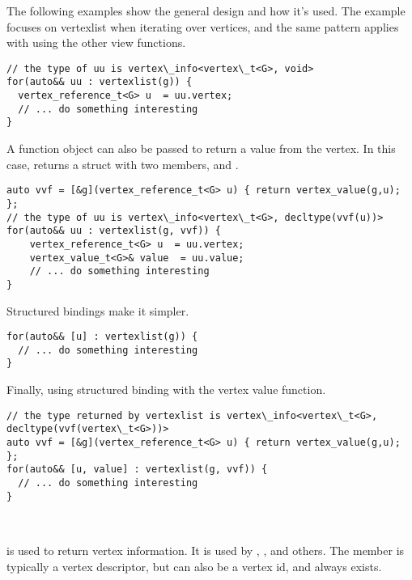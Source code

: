 The following examples show the general design and how it's used. The example focuses 
on vertexlist when iterating over vertices, and the same pattern applies with using the other
view functions.

\begin{lstlisting}
// the type of uu is vertex\_info<vertex\_t<G>, void>
for(auto&& uu : vertexlist(g)) {
  vertex_reference_t<G> u  = uu.vertex;
  // ... do something interesting
}
\end{lstlisting}

A function object can also be passed to return a value from the vertex. In this case,  returns 
a struct with two members,  and .
\begin{lstlisting}
auto vvf = [&g](vertex_reference_t<G> u) { return vertex_value(g,u); };
// the type of uu is vertex\_info<vertex\_t<G>, decltype(vvf(u))>
for(auto&& uu : vertexlist(g, vvf)) {
    vertex_reference_t<G> u  = uu.vertex;
    vertex_value_t<G>& value  = uu.value;
    // ... do something interesting
}
\end{lstlisting}
    
Structured bindings make it simpler.
\begin{lstlisting}
for(auto&& [u] : vertexlist(g)) {
  // ... do something interesting
}
\end{lstlisting}

Finally, using structured binding with the vertex value function.
\begin{lstlisting}
// the type returned by vertexlist is vertex\_info<vertex\_t<G>, decltype(vvf(vertex\_t<G>))>
auto vvf = [&g](vertex_reference_t<G> u) { return vertex_value(g,u); };
for(auto&& [u, value] : vertexlist(g, vvf)) {
  // ... do something interesting
}
\end{lstlisting}

\subsection{}\label{vertex-view}\mbox{} \\
 is used to return vertex information. It is used by , , 
 and others. The  member is typically a vertex descriptor, but can also be a vertex id, and always
exists.

{\small
     
}

